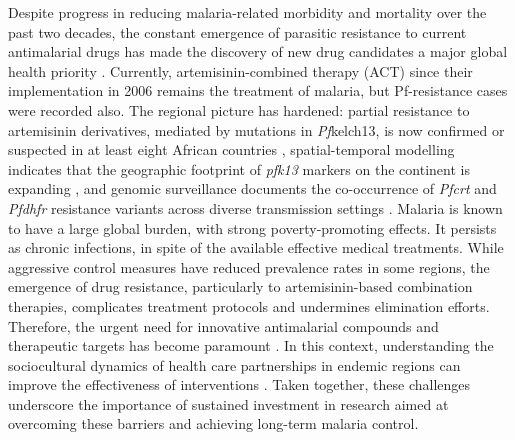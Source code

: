 Despite progress in reducing malaria-related morbidity and mortality over the past two decades, the constant emergence of parasitic resistance to current antimalarial drugs has made the discovery of new drug candidates a major global health priority \cite{Neves2020,Raphemot2016}. Currently, artemisinin-combined therapy (ACT) since their implementation in 2006 remains the treatment of malaria, but Pf-resistance cases were recorded also. The regional picture has hardened: partial resistance to artemisinin derivatives, mediated by mutations in \emph{Pf}kelch13, is now confirmed or suspected in at least eight African countries \cite{artemisinin_partial_resistance}, spatial-temporal modelling indicates that the geographic footprint of \emph{pfk13} markers on the continent is expanding \cite{young2026artemisinin}, and genomic surveillance documents the co-occurrence of \emph{Pfcrt} and \emph{Pfdhfr} resistance variants across diverse transmission settings \cite{letebo2026surveillance,global_resistance_landscape_2026,pfk13_resistance_2026}. Malaria is known to have a large global burden, with strong poverty-promoting effects. It persists as chronic infections, in spite of the available effective medical treatments. While aggressive control measures have reduced prevalence rates in some regions, the emergence of drug resistance, particularly to artemisinin-based combination therapies, complicates treatment protocols and undermines elimination efforts. Therefore, the urgent need for innovative antimalarial compounds and therapeutic targets has become paramount \cite{Mathews2018}. In this context, understanding the sociocultural dynamics of health care partnerships in endemic regions can improve the effectiveness of interventions \cite{Kraeker2013}. Taken together, these challenges underscore the importance of sustained investment in research aimed at overcoming these barriers and achieving long-term malaria control.


